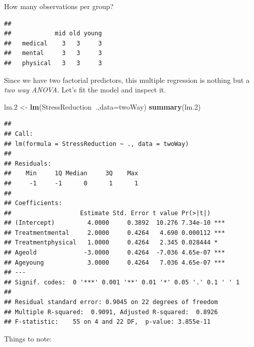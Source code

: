 \documentclass[]{book}
\newenvironment{Shaded}{\begin{snugshade}}{\end{snugshade}}
\newcommand{\KeywordTok}[1]{\textcolor[rgb]{0.13,0.29,0.53}{\textbf{#1}}}
\newcommand{\DataTypeTok}[1]{\textcolor[rgb]{0.13,0.29,0.53}{#1}}
\newcommand{\DecValTok}[1]{\textcolor[rgb]{0.00,0.00,0.81}{#1}}
\newcommand{\StringTok}[1]{\textcolor[rgb]{0.31,0.60,0.02}{#1}}
\newcommand{\OperatorTok}[1]{\textcolor[rgb]{0.81,0.36,0.00}{\textbf{#1}}}
\newcommand{\NormalTok}[1]{#1}
\theoremstyle{definition}
\theoremstyle{definition}
\theoremstyle{definition}
\theoremstyle{remark}
\begin{document}
How many observations per group?

\begin{Shaded}
\end{Shaded}

\begin{verbatim}
##           
##            mid old young
##   medical    3   3     3
##   mental     3   3     3
##   physical   3   3     3
\end{verbatim}

Since we have two factorial predictors, this multiple regression is
nothing but a \emph{two way ANOVA}. Let's fit the model and inspect it.

\begin{Shaded}
\begin{Highlighting}[]
\NormalTok{lm.}\DecValTok{2}\NormalTok{ <-}\StringTok{ }\KeywordTok{lm}\NormalTok{(StressReduction}\OperatorTok{~}\NormalTok{.,}\DataTypeTok{data=}\NormalTok{twoWay)}
\KeywordTok{summary}\NormalTok{(lm.}\DecValTok{2}\NormalTok{)}
\end{Highlighting}
\end{Shaded}

\begin{verbatim}
## 
## Call:
## lm(formula = StressReduction ~ ., data = twoWay)
## 
## Residuals:
##    Min     1Q Median     3Q    Max 
##     -1     -1      0      1      1 
## 
## Coefficients:
##                   Estimate Std. Error t value Pr(>|t|)    
## (Intercept)         4.0000     0.3892  10.276 7.34e-10 ***
## Treatmentmental     2.0000     0.4264   4.690 0.000112 ***
## Treatmentphysical   1.0000     0.4264   2.345 0.028444 *  
## Ageold             -3.0000     0.4264  -7.036 4.65e-07 ***
## Ageyoung            3.0000     0.4264   7.036 4.65e-07 ***
## ---
## Signif. codes:  0 '***' 0.001 '**' 0.01 '*' 0.05 '.' 0.1 ' ' 1
## 
## Residual standard error: 0.9045 on 22 degrees of freedom
## Multiple R-squared:  0.9091, Adjusted R-squared:  0.8926 
## F-statistic:    55 on 4 and 22 DF,  p-value: 3.855e-11
\end{verbatim}

Things to note:
\end{document}
